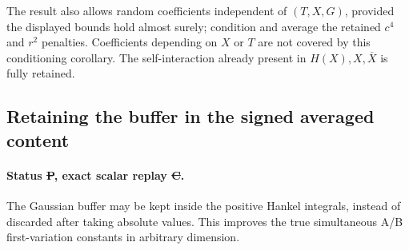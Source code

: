 The result also allows random coefficients independent of $(T,X,G)$,
provided the displayed bounds hold almost surely; condition and average
the retained $c^4$ and $r^2$ penalties. Coefficients depending on $X$ or
$T$ are not covered by this conditioning corollary. The self-interaction
already present in $H(X),X,\overline X$ is fully retained.


\subsection{Retaining the buffer in the signed averaged content}
\label{sec:buffered-content-new}
\paragraph{Status \st{P}, exact scalar replay \st{C}.}
The Gaussian buffer may be kept inside the positive Hankel integrals,
instead of discarded after taking absolute values. This improves the
true simultaneous A/B first-variation constants in arbitrary dimension.

